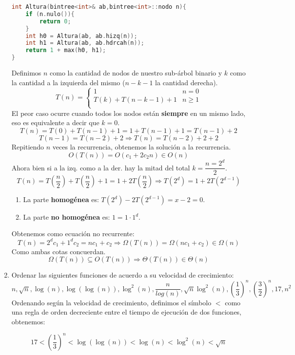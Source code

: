 \documentclass{article}
\makeatletter
\newcommand{\reqnomode}{\tagsleft@false\let\veqno\@@eqno}
\makeatother
\begin{document}
\begin{enumerate}
\begin{lstlisting}[language=c++]
int Altura(bintree<int>& ab,bintree<int>::nodo n){
	if (n.nulo()){
		return 0;
	}
	int h0 = Altura(ab, ab.hizq(n));
	int h1 = Altura(ab, ab.hdrcah(n));
	return 1 + max(h0, h1);
}
\end{lstlisting}
Definimos $n$ como la cantidad de nodos de nuestro sub-árbol binario y $k$ como la cantidad a la izquierda del mismo ($n-k-1$ la cantidad derecha).
\[   
T(n) = 
\begin{cases}
1 & n = 0\\
T(k)+T(n-k-1)+1 & n \ge 1\\
\end{cases}
\]
El peor caso ocurre cuando todos los nodos están \textbf{siempre} en un mismo lado, eso es equivalente a decir que $k=0$.
\[
	T(n)=T(0)+T(n-1)+1=1+T(n-1)+1=T(n-1)+2
\]
\[
	T(n-1)=T(n-2)+2\Rightarrow T(n)=T(n-2)+2+2
\]
Repitiendo $n$ veces la recurrencia, obtenemos la solución a la recurrencia.
\[
	O(T(n))=O(c_1+2c_2n)\in O(n)
\]
Ahora bien si a la izq. como a la der. hay la mitad del total $k=\dfrac{n=2^d}{2}$.
\[
T(n)=T\left(\dfrac{n}{2}\right)+T\left(\dfrac{n}{2}\right)+1=1+2T\left(\dfrac{n}{2}\right)\Rightarrow T(2^d)=1+2T(2^{d-1})
\]
\begin{enumerate}
	\item La parte \textbf{homogénea} es: $T(2^d)-2T(2^{d-1})=x-2=0$.
	\item La parte \textbf{no homogénea} es: $1=1\cdot 1^d$.
\end{enumerate}
Obtenemos como ecuación no recurrente:
\[
	T(n)=2^dc_1+1^dc_2=nc_1+c_2\Rightarrow \Omega(T(n))=\Omega(nc_1+c_2)\in \Omega(n)
\]
Como ambas cotas concuerdan.
\[\Omega(T(n))\subseteq O(T(n))\Rightarrow \Theta(T(n))\in\Theta(n)\]
\newpage
\item Ordenar las siguientes funciones de acuerdo a su velocidad de crecimiento:
\[
n,\sqrt{n}, \log(n), \log(\log(n)), \log^2(n),\dfrac{n}{log(n)},\sqrt{n}\log^2(n),\left(\dfrac{1}{3}\right)^n,\left(\dfrac{3}{2}\right)^n,17,n^2
\]
Ordenando según la velocidad de crecimiento, definimos el símbolo $<$ como una regla de orden decreciente entre el tiempo de ejecución de dos funciones, obtenemos:

\reqnomode
\begin{equation}
	17<\left(\dfrac{1}{3}\right)^n<\log(\log(n))<\log(n)<\log^2(n)<\sqrt{n}\tag{*}
\end{equation}


\end{enumerate}
\end{document}
